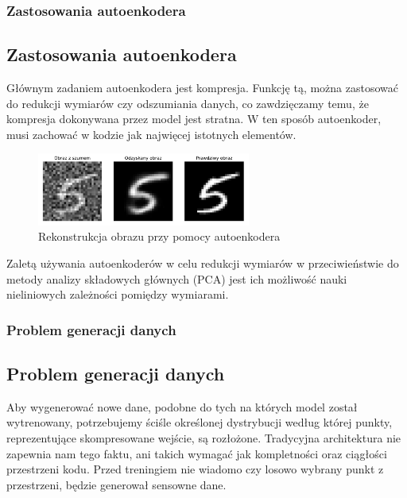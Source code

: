 \documentclass{beamer}
\begin{document}
	\begin{frame}
		\frametitle{Zastosowania autoenkodera}
		\subsection{Zastosowania autoenkodera}
		Głównym zadaniem autoenkodera jest kompresja. Funkcję tą, można zastosować do redukcji wymiarów czy odszumiania danych, co zawdzięczamy temu, że kompresja dokonywana przez model jest stratna. W ten sposób autoenkoder, musi zachować w kodzie jak najwięcej istotnych elementów. 
		\vspace{-0.3cm}
		\begin{figure}
			\centering\includegraphics[width=7cm]{denoisingae.pdf}
			\caption{Rekonstrukcja obrazu przy pomocy autoenkodera}
		\end{figure}
		\vspace{-0.5cm}
		Zaletą używania autoenkoderów w celu redukcji wymiarów w przeciwieństwie do metody analizy składowych głównych (PCA) jest ich możliwość nauki nieliniowych zależności pomiędzy wymiarami.
	\end{frame}

	\begin{frame}
		\frametitle{Problem generacji danych}
		\subsection{Problem generacji danych}
		Aby wygenerować nowe dane, podobne do tych na których model został wytrenowany, potrzebujemy ściśle określonej dystrybucji według której punkty, reprezentujące skompresowane wejście, są rozłożone. Tradycyjna architektura nie zapewnia nam tego faktu, ani takich wymagać jak kompletności oraz ciągłości przestrzeni kodu. Przed treningiem nie wiadomo czy losowo wybrany punkt z przestrzeni, będzie generował sensowne dane.
	\end{frame}
		
\end{document}
